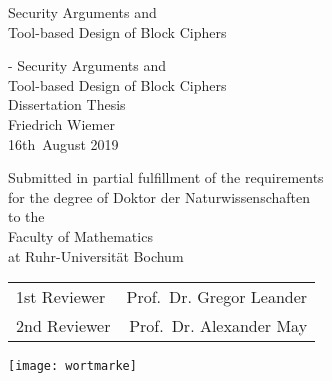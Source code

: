 \thispagestyle{empty}
{
    \begin{fullwidth}
        \centering
        \hphantom{.}
        \vfill
        {\Huge
            Security Arguments and\\
            Tool-based Design of Block Ciphers
        }
        \vfill
        \vfill
    \end{fullwidth}
}

\clearpage{}

\cleardoublepage{}

\thispagestyle{empty}
{
    \calccentering{\unitlength}
    \begin{adjustwidth*}{\unitlength}{-\unitlength}
        \raggedleft{}
        {\Huge\color{Burgundy}%
        Security Arguments and\\
        Tool-based Design of Block Ciphers}\\[\baselineskip]
        {\LARGE%
        Dissertation Thesis}\\[0.2\textheight]
        {\huge%
        Friedrich Wiemer}\\[\baselineskip]
        {\LARGE%
        16th~August 2019}
        \vfill
        \vfill
        {\large%
        Submitted in partial fulfillment of the requirements\\
        for the degree of Doktor der Naturwissenschaften\\[\baselineskip]%

        to the\\[\baselineskip]

        Faculty of Mathematics\\
        at Ruhr-Universität Bochum\\[2\baselineskip]

        \begin{minipage}{0.5\textwidth}
        \begin{tabular}{lr}
            1st\hspace{4pt} Reviewer & Prof.\ Dr. Gregor Leander\\
            2nd Reviewer & Prof.\ Dr.\; Alexander May
        \end{tabular}
        \end{minipage}
        \hspace*{36pt}

        \vfill
        }
        {\texttt{[image: wortmarke]}}
        \vspace*{\baselineskip}
    \end{adjustwidth*}
}

